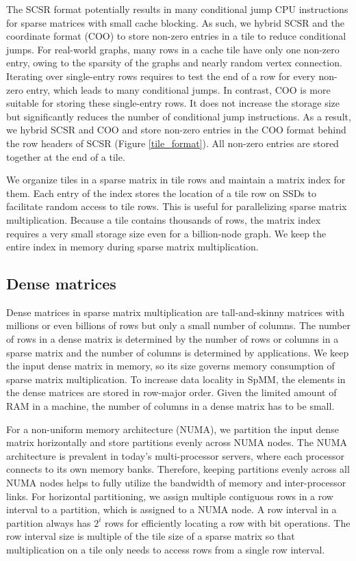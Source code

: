 The SCSR format potentially results in many conditional jump CPU instructions
for sparse matrices with small cache blocking. As such, we hybrid SCSR and
the coordinate format (COO) to store non-zero entries in a tile to reduce
conditional jumps.
For real-world graphs, many rows in a cache tile have only one non-zero entry,
owing to the sparsity of the graphs and nearly random vertex connection.
Iterating over single-entry rows requires to test the end of a row for every
non-zero entry, which leads to many conditional jumps.
In contrast, COO is more suitable for storing these
single-entry rows. It does not increase the storage size but significantly
reduces the number of conditional jump instructions. As a result, we hybrid
SCSR and COO and store non-zero entries in the COO format behind the row headers
of SCSR (Figure \ref{tile_format}). All non-zero entries are
stored together at the end of a tile.

We organize tiles in a sparse matrix in tile rows and maintain a matrix index
for them. Each entry of the index stores the location of a tile row on SSDs
to facilitate random access
to tile rows. This is useful for parallelizing sparse matrix multiplication.
Because a tile contains thousands of rows, the matrix index requires a very
small storage size even for a billion-node graph. We keep the entire index
in memory during sparse matrix multiplication.

\subsection{Dense matrices}
Dense matrices in sparse matrix multiplication are tall-and-skinny matrices
with millions or even billions of rows but only a small number of columns.
The number of rows in a dense matrix is determined by the number of rows or
columns in a sparse matrix and the number of columns is determined by applications.
We keep the input dense matrix in memory, so its size governs memory consumption
of sparse matrix multiplication. To increase data locality in SpMM, the elements
in the dense matrices are stored in row-major order.
Given the limited amount of RAM in a machine,
the number of columns in a dense matrix has to be small.

For a non-uniform memory architecture (NUMA), we partition the input dense matrix
horizontally and store partitions evenly across NUMA nodes. The NUMA architecture
is prevalent in today's multi-processor servers, where each processor connects
to its own memory banks. Therefore, keeping partitions evenly across all NUMA
nodes helps to fully utilize the bandwidth of memory and inter-processor links.
For horizontal partitioning, we assign multiple contiguous rows in a row
interval to a partition, which is assigned to a NUMA node. A row interval
in a partition always has $2^i$ rows for efficiently locating a row
with bit operations. The row interval size is multiple of the tile size of
a sparse matrix so that multiplication on a tile only needs to access rows
from a single row interval.

